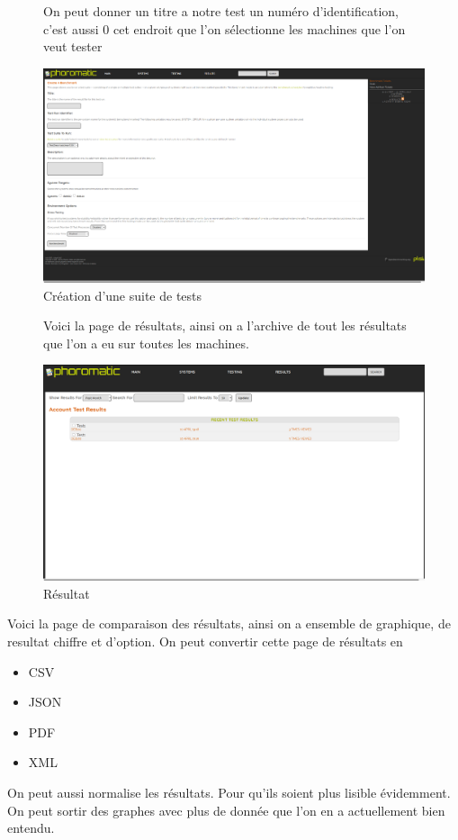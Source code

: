 \documentclass[french]{article}
\begin{document}
\begin{figure}[!h]
On peut donner un titre a notre test un numéro d'identification, c'est aussi 0 cet endroit que l'on sélectionne les machines que l'on veut tester
\caption{\label{Création d'une suite de tests} Création d'une suite de tests}
\includegraphics[scale=0.35]{images/createBench.png}
\end{figure}


\newpage
\begin{figure}[!h]
Voici la page de résultats, ainsi on a l'archive de tout les résultats que l'on a eu sur toutes les machines.
\caption{\label{Résultat 2 } Résultat}
\includegraphics[scale=0.35]{images/res.png}
\end{figure}

\newpage
Voici la page de comparaison des résultats, ainsi on a ensemble de graphique, de resultat chiffre et d'option.
On peut convertir cette page de résultats en 
\begin{itemize}
\item CSV
\item JSON
\item PDF
\item XML
\end{itemize}
On peut aussi normalise les résultats. Pour qu'ils soient plus lisible évidemment. On peut sortir des graphes avec plus de donnée que l'on en a actuellement bien entendu. 
\end{document}
